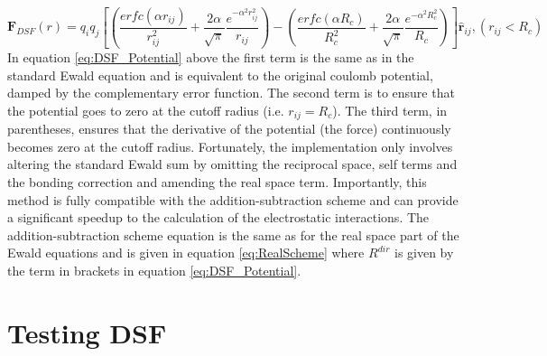\begin{equation}
  \mathbf{F}_{DSF}(r) = q_i q_j \left[ \left( \frac{erfc(\alpha r_{ij})}{r_{ij}^2} + \frac{2 \alpha}{\sqrt{\pi}} \frac{e^{-\alpha^2 r_{ij}^2}}{r_{ij}}\right) - \left(\frac{erfc(\alpha                   R_{c})}{R_{c}^2} + \frac{2 \alpha}{\sqrt{\pi}} \frac{e^{-\alpha^2 R_{c}^2}}{R_{c}} \right) \right] \hat{\mathbf{r}}_{ij} , (r_{ij} < R_{c})
  \label{eq:DSF_Force}
\end{equation}
In equation \eqref{eq:DSF_Potential} above the first term is the same as in the standard Ewald equation and is equivalent to the original coulomb potential, damped by the complementary error function. The second term is to ensure that the potential goes to zero at the cutoff radius (i.e. $r_{ij} = R_{c}$). The third term, in parentheses, ensures that the derivative of the potential (the force) continuously becomes zero at the cutoff radius. Fortunately, the implementation only involves altering the standard Ewald sum by omitting the reciprocal space, self terms and the bonding correction and amending the real space term. Importantly, this method is fully compatible with the addition-subtraction scheme and can provide a significant speedup to the calculation of the electrostatic interactions. The addition-subtraction scheme equation is the same as for the real space part of the Ewald equations and is given in equation \eqref{eq:RealScheme} where $R^{dir}$ is given by the term in brackets in equation \eqref{eq:DSF_Potential}.
\section{Testing DSF}

